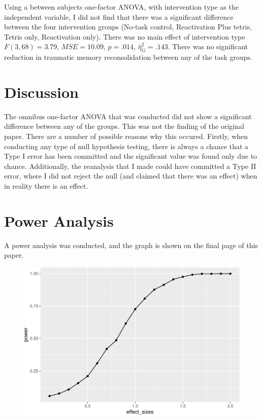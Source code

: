 \documentclass[man]{apa6}
\begin{document}
Using a between subjects one-factor ANOVA, with intervention type as the
independent variable, I did not find that there was a significant
difference between the four intervention groups (No-task control,
Reactivation Plus tetris, Tetris only, Reactivation only). There was no
main effect of intervention type \(F(3, 68) = 3.79\),
\(\mathit{MSE} = 10.09\), \(p = .014\), \(\hat{\eta}^2_G = .143\). There
was no significant reduction in traumatic memory reconsolidation between
any of the task groups.

\section{Discussion}\label{discussion}

The omnibus one-factor ANOVA that was conducted did not show a
significant difference between any of the groups. This was not the
finding of the original paper. There are a number of possible reasons
why this occured. Firstly, when conducting any type of null hypothesis
testing, there is always a chance that a Type I error has been committed
and the significant value was found only due to chance. Additionally,
the reanalysis that I made could have committed a Type II error, where I
did not reject the null (and claimed that there was an effect) when in
reality there is an effect.

\newpage

\section{Power Analysis}\label{power-analysis}

A power analysis was conducted, and the graph is shown on the final page
of this paper.

\begin{figure}
\centering
\includegraphics{Midterm_Paper_files/figure-latex/unnamed-chunk-2-1.pdf}
\caption{}
\end{figure}
\end{document}
